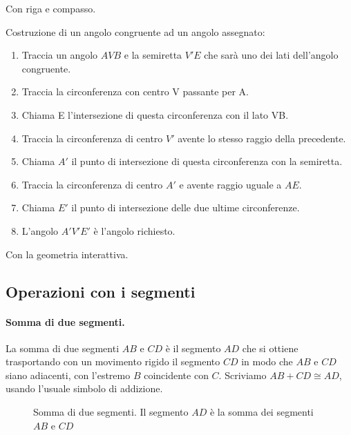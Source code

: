 Con riga e compasso.

\begin{procedura}\label{proc:fonda_trasp_ang}
 Costruzione di un angolo congruente ad un angolo assegnato:
\begin{enumerate} [nosep]
\item 
Traccia un angolo \(AVB\) e la semiretta  \(V'E\) che sarà uno dei lati 
dell'angolo congruente.
\item 
Traccia la circonferenza con centro V passante per A.
\item
Chiama E l'intersezione di questa circonferenza con il lato VB.
\item 
Traccia la circonferenza di centro \(V'\)  avente lo stesso raggio della 
precedente.
\item
Chiama \(A'\) il punto di intersezione di questa circonferenza con la 
semiretta. 
\item 
Traccia la circonferenza di centro \(A'\) e  avente raggio uguale a \(AE\).
\item 
Chiama \(E'\) il punto di intersezione delle due ultime circonferenze.
\item 
L'angolo \(A'V'E'\) è l'angolo richiesto.
\end{enumerate}
\end{procedura}

\ifcoding
Con la geometria interattiva.


\fi

\subsection{Operazioni con i segmenti}

\paragraph{Somma di due segmenti.} La somma di due segmenti $AB$ e 
$CD$ è il segmento $AD$ che si ottiene trasportando con un movimento 
rigido il segmento $CD$ in modo che $AB$ e $CD$ siano adiacenti, con 
l'estremo $B$ coincidente con $C$. Scriviamo $AB + CD \cong AD$, 
usando l'usuale simbolo di addizione.


\begin{inaccessibleblock}
 \begin{figure}[htb]
\centering
\caption{Somma di due segmenti. Il segmento $AD$ è la somma dei 
segmenti $AB$ e $CD$}
\end{figure}
\end{inaccessibleblock}

